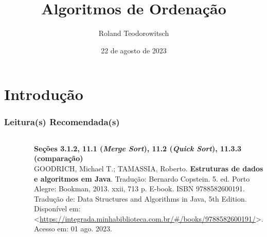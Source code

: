 \documentclass[aspectratio=169]{beamer}
\title[\sc{Algoritmos de Ordenação}]{Algoritmos de Ordenação}
\author[Roland Teodorowitsch]{Roland Teodorowitsch}
\institute[ALEST I - EP - PUCRS]{Algoritmos e Estruturas de Dados I - Escola Politécnica - PUCRS}
\date{22 de agosto de 2023}
\begin{document}
\justifying

\begin{frame}
	\titlepage
\end{frame}

\section{Introdução}

\begin{frame}\frametitle{Leitura(s) Recomendada(s)}

\begin{columns}[T]
\begin{column}{0.15\linewidth}
\vspace{-3mm}
\begin{figure}[h]
	\centering
	\includegraphics[height=0.3\paperheight]{imagens/livro_goodrich.jpg}
\end{figure}
\end{column}
\begin{column}{0.85\linewidth}
\vspace{3mm}
\textbf{Seções 3.1.2, 11.1 (\emph{Merge Sort}), 11.2 (\emph{Quick Sort}), 11.3.3 (comparação)}\\
\scriptsize{GOODRICH, Michael T.; TAMASSIA, Roberto. \textbf{Estruturas de dados e algoritmos em Java}. Tradução: Bernardo Copstein. 5. ed. Porto Alegre: Bookman, 2013. xxii, 713 p. E-book. ISBN 9788582600191. Tradução de: Data Structures and Algorithms in Java, 5th Edition. Disponível em: \textless{}\url{https://integrada.minhabiblioteca.com.br/\#/books/9788582600191/}\textgreater{}. Acesso em: 01 ago. 2023.}
\end{column}
\end{columns}

\end{frame}
\end{document}
